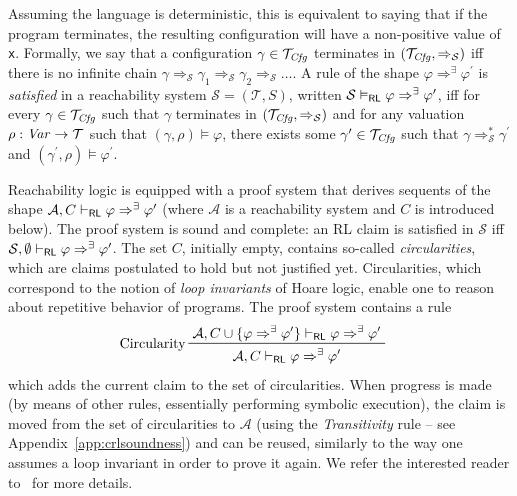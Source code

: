 Assuming the language is deterministic, this is equivalent to saying that if the program terminates,
the resulting configuration will have a non-positive value of \texttt{x}.
Formally, we say that a configuration $\gamma \in \mathcal{T}_{\mathit{Cfg}}$ terminates in $(\mathcal{T}_{\mathit{Cfg}}, \Rightarrow_{\mathcal{S}})$
iff there is no infinite chain
$\gamma \Rightarrow_{\mathcal{S}} \gamma_1 \Rightarrow_{\mathcal{S}} \gamma_2 \Rightarrow_{\mathcal{S}} \ldots$.
A rule of the shape $\varphi \Rightarrow^\exists \varphi^\prime$
is \emph{satisfied}
in a reachability system $\mathcal{S} = (\mathcal{T}, S)$,
written $\mathcal{S} \vDash_{\mathsf{RL}} \varphi \Rightarrow^\exists \varphi^\prime$,
iff for every $\gamma \in \mathcal{T}_{\mathit{Cfg}}$
such that $\gamma$ terminates in $(\mathcal{T}_{\mathit{Cfg}}, \Rightarrow_{\mathcal{S}})$
and for any valuation $\rho : \mathit{Var} \to \mathcal{T}$
such that $(\gamma, \rho) \vDash \varphi$,
there exists some $\gamma^\prime \in \mathcal{T}_{\mathit{Cfg}}$
such that
$\gamma \Rightarrow^{*}_{\mathcal{S}} \gamma^\prime$
and $(\gamma^\prime, \rho) \vDash \varphi^\prime$.


Reachability logic is equipped with a proof system that derives sequents of the shape
$\mathcal{A}, C \vdash_{\mathsf{RL}} \varphi \Rightarrow^\exists \varphi^\prime$ (where $\mathcal{A}$ is a
reachability system and $C$ is introduced below). The proof system is sound and complete: an RL claim is satisfied in $\mathcal{S}$
iff $\mathcal{S}, \emptyset \vdash_{\mathsf{RL}} \varphi \Rightarrow^\exists \varphi^\prime$.
The set $C$, initially empty, contains so-called \emph{circularities},
which are claims postulated to hold but not justified yet.
Circularities, which correspond to the notion of \emph{loop invariants} of Hoare logic,
enable one to reason about repetitive behavior of programs.
The proof system contains a rule
\begin{align*}
    & \prftree[l]{Circularity}
      { \mathcal{A}, C \cup \{ \varphi\Rightarrow^\exists \varphi^\prime \} \vdash_\RL \varphi \Rightarrow^\exists \varphi^\prime }
      { \mathcal{A}, C \vdash_\RL \varphi \Rightarrow^\exists \varphi^\prime }
\end{align*}
which adds the current claim to the set of circularities.  When progress is
made (by means of other rules, essentially performing symbolic execution),
the claim is moved from the set of circularities to $\mathcal{A}$ (using the
\emph{Transitivity} rule -- see Appendix~\ref{app:crlsoundness}) and can be
reused, similarly to the way one assumes a loop invariant in order to prove it
again.  We refer the interested reader to~\cite{RosuS12oopsla} for more
details.


